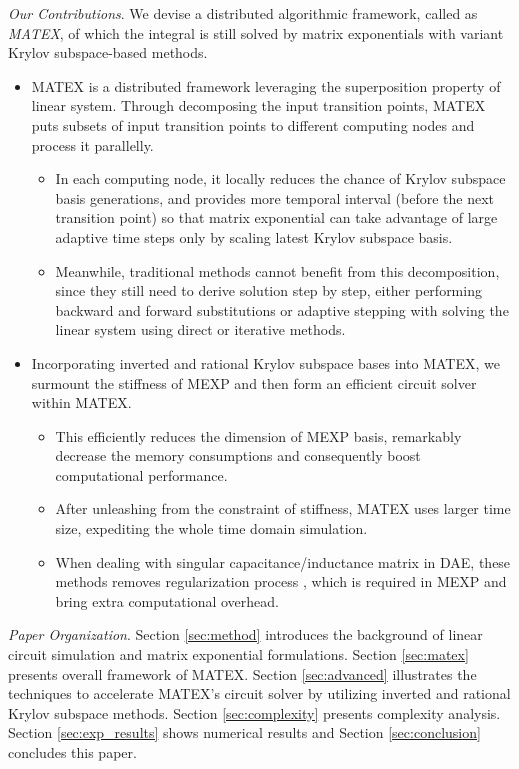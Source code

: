 \emph{Our Contributions}. 
We devise a distributed algorithmic framework, called as \emph{MATEX}, 
of which the integral is still solved by matrix exponentials 
with variant Krylov subspace-based methods. 
\begin{itemize}
\item 
MATEX is a distributed framework leveraging the superposition property of linear system.
Through decomposing the input transition points, MATEX puts subsets of 
input transition points to different computing nodes and  process it parallelly.
\begin{itemize}
\item
In each computing node, it locally reduces the chance of Krylov subspace basis generations,
and provides more temporal interval (before the next transition point) 
so that matrix exponential can take advantage of large adaptive time steps only by scaling latest Krylov subspace basis.
\item
Meanwhile, traditional methods cannot benefit from this decomposition, since they still need to derive
solution step by step, either performing backward and forward substitutions 
or adaptive stepping with solving the linear system using direct or iterative methods.
\end{itemize}
\item 
Incorporating inverted and rational Krylov subspace bases into MATEX, we surmount the stiffness of MEXP and then form an efficient circuit solver within MATEX.
\begin{itemize}
\item 
This efficiently reduces the dimension of MEXP basis, 
remarkably decrease the memory consumptions 
and consequently boost computational performance. 
\item 
After unleashing from the constraint of stiffness, MATEX uses larger time size, expediting the whole time domain simulation.
\item
When dealing with singular capacitance/inductance matrix in DAE, these methods removes 
regularization process \cite{Chen12_TCAD, Weng12_TCAD}, which is required 
in MEXP\cite{Weng12_TCAD} and bring extra computational overhead.
\end{itemize}
\end{itemize}
\emph{Paper Organization}.
Section \ref{sec:method} introduces the background of
linear circuit simulation and matrix exponential formulations.
Section \ref{sec:matex} presents overall framework of MATEX.  
Section \ref{sec:advanced} illustrates the techniques to accelerate MATEX's circuit solver by
utilizing inverted and rational Krylov subspace methods. 
Section \ref{sec:complexity} presents complexity analysis.
Section \ref{sec:exp_results} shows numerical results 
and Section \ref{sec:conclusion} concludes this paper.


